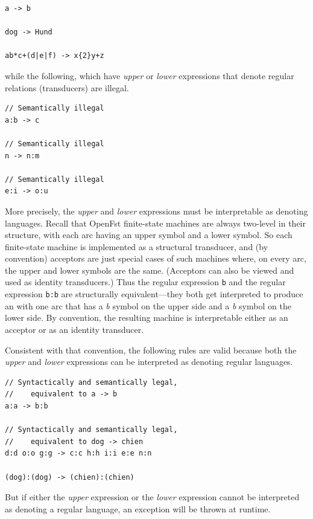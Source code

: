 \begin{Verbatim}
a -> b

dog -> Hund

ab*c+(d|e|f) -> x{2}y+z
\end{Verbatim}

\noindent
while the following, which have \emph{upper} or \emph{lower} expressions that denote regular relations
(transducers) are illegal.

\begin{Verbatim}
// Semantically illegal
a:b -> c

// Semantically illegal
n -> n:m

// Semantically illegal
e:i -> o:u
\end{Verbatim}


More precisely, the \emph{upper} and \emph{lower} expressions must be interpretable as denoting
languages.  Recall that OpenFst finite-state machines are always
two-level in their structure, with each arc having an
upper symbol and a lower symbol.  So each finite-state machine is
implemented as a structural transducer, and (by convention)
acceptors are just special cases of such machines where, on every arc, the upper and lower symbols are the
same.  (Acceptors can also be viewed and used as identity transducers.)  Thus the regular expression \texttt{b} and the regular expression \texttt{b:b} are structurally
equivalent---they both get interpreted to produce an \fsm{} with one arc that has a \emph{b} symbol on
the upper side and a \emph{b} symbol on the lower side.  By convention,
the resulting machine is interpretable either as an acceptor or as an identity
transducer.

Consistent with that convention, the following rules are valid because both the \emph{upper} and
\emph{lower} expressions can be interpreted as denoting regular
languages.

\begin{Verbatim}
// Syntactically and semantically legal, 
//    equivalent to a -> b
a:a -> b:b

// Syntactically and semantically legal, 
//    equivalent to dog -> chien
d:d o:o g:g -> c:c h:h i:i e:e n:n

(dog):(dog) -> (chien):(chien)
\end{Verbatim}

\noindent
But if either the \emph{upper} expression or the \emph{lower} expression cannot be interpreted as
denoting a regular language, an exception will be thrown at runtime.

